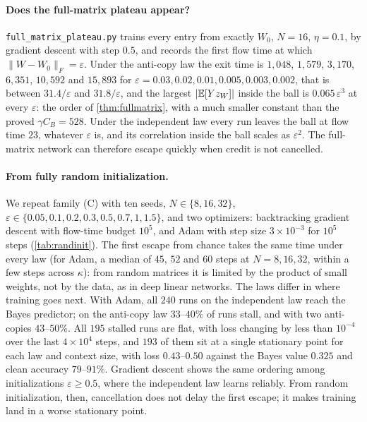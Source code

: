 \paragraph{Does the full-matrix plateau appear?}
\texttt{full\_matrix\_plateau.py} trains every entry from exactly $W_0$, $N=16$, $\eta=0.1$, by gradient descent with step $0.5$, and records the first flow time at which
$\|W-W_0\|_F=\varepsilon$. Under the anti-copy law the exit time is $1{,}048$, $1{,}579$, $3{,}170$, $6{,}351$, $10{,}592$ and $15{,}893$ for
$\varepsilon=0.03,0.02,0.01,0.005,0.003,0.002$, that is between $31.4/\varepsilon$ and $31.8/\varepsilon$, and the largest $|\mathbb E[Yz_W]|$ inside the ball is $0.065\,\varepsilon^3$ at every $\varepsilon$:
the order of \cref{thm:fullmatrix}, with a much smaller constant than the proved $\gamma C_B=528$. Under the independent law every run leaves the ball at flow time $23$,
whatever $\varepsilon$ is, and its correlation inside the ball scales as $\varepsilon^2$. The full-matrix network can therefore escape quickly when credit is not cancelled.

\paragraph{From fully random initialization.}
We repeat family (C) with ten seeds, $N\in\{8,16,32\}$, $\varepsilon\in\{0.05,0.1,0.2,0.3,0.5,0.7,1,1.5\}$, and two optimizers: backtracking gradient descent with
flow-time budget $10^5$, and Adam with step size $3\times10^{-3}$ for $10^5$ steps (\cref{tab:randinit}).
The first escape from chance takes the same time under every law (for Adam, a median of $45$, $52$ and $60$ steps at $N=8,16,32$, within a few steps across $\kappa$):
from random matrices it is limited by the product of small weights, not by the data, as in deep linear networks.
The laws differ in where training goes next. With Adam, all $240$ runs on the independent law reach the Bayes predictor; on the anti-copy law $33$--$40\%$ of runs
stall, and with two anti-copies $43$--$50\%$. All $195$ stalled runs are flat, with loss changing by less than $10^{-4}$ over the last $4\times10^4$ steps, and $193$ of them sit at a single stationary point
for each law and context size, with loss $0.43$--$0.50$ against the Bayes value $0.325$ and clean accuracy $79$--$91\%$. Gradient descent shows the same ordering among initializations $\varepsilon\ge0.5$, where the
independent law learns reliably. From random initialization, then, cancellation does not delay the first escape; it makes training land in a worse stationary point.

